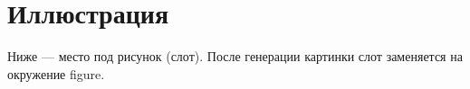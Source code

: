 \section{Иллюстрация}
Ниже --- место под рисунок (слот). После генерации картинки слот
заменяется на окружение figure.

